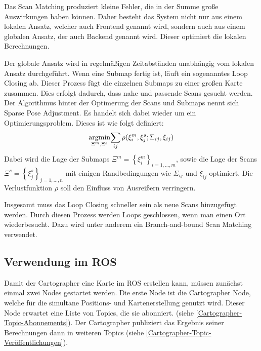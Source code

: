 Das Scan Matching produziert kleine Fehler, die in der Summe große Auswirkungen haben können. Daher besteht das System nicht nur aus einem lokalen Ansatz, welcher auch Frontend genannt wird, sondern auch aus einem globalen Ansatz, der auch Backend genannt wird. Dieser optimiert die lokalen Berechnungen.

Der globale Ansatz wird in regelmäßigen Zeitabständen unabhängig vom lokalen Ansatz durchgeführt. Wenn eine Submap fertig ist, läuft ein sogenanntes Loop Closing ab. Dieser Prozess fügt die einzelnen Submaps zu einer großen Karte zusammen. Dies erfolgt dadurch, dass nahe und passende Scans gesucht werden. Der Algorithmus hinter der Optimerung der Scans und Submaps nennt sich Sparse Pose Adjustment. Es handelt sich dabei wieder um ein Optimierungsproblem. Dieses ist wie folgt definiert:
\begin{align}
    \underset{\Xi^m,\Xi^s}{\operatorname*{argmin} } { \sum_{ij} {\rho(\xi_{i}^m,\xi_{j}^s;\Sigma_{ij},\xi_{ij})} }
\end{align}
Dabei wird die Lage der Submaps $ \Xi^m = \left\{\xi_{i}^m\right\}_{i=1,...,m} $, sowie die Lage der Scans $ \Xi^s = \left\{\xi_{j}^s\right\}_{j=1,...,n} $ mit einigen Randbedingungen wie $ \Sigma_{ij} $ und $ \xi_{ij} $ optimiert. Die Verlustfunktion $ \rho $ soll den Einfluss von Ausreißern verringern. 

Insgesamt muss das Loop Closing schneller sein als neue Scans hinzugefügt werden. Durch diesen Prozess werden Loops geschlossen, wenn man einen Ort wiederbesucht. Dazu wird unter anderem ein Branch-and-bound Scan Matching verwendet. \autocite{45466}

\subsection{Verwendung im \acl{ROS}} \label{rosVerwendungCartographer}

Damit der Cartographer eine Karte im \ac{ROS} erstellen kann, müssen zunächst einmal zwei Nodes gestartet werden. Die erste Node ist die Cartographer Node, welche für die simultane Positions- und Kartenerstellung genutzt wird. Dieser Node erwartet eine Liste von Topics, die sie abonniert. (siehe \autoref{Cartographer-Topic-Abonnements}). Der Cartographer publiziert das Ergebnis seiner Berechnungen dann in weiteren Topics (siehe \autoref{Cartographer-Topic-Veröffentlichungen}).

